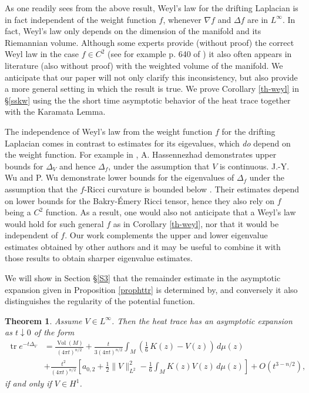 \documentclass[letterpaper,12pt]{amsart}
\newtheorem{thm}{Theorem}[section]
\newcommand{\tr}{\mathop{\mathrm{tr}}}
\newcommand{\Vol}{\operatorname{Vol}}
\begin{document}
As one readily sees from the above result, Weyl's law for the drifting Laplacian is in fact independent of the weight function $f$, whenever $\nabla f$ and $\Delta f$ are in $L^\infty$. In fact, Weyl's law only depends on the dimension of the manifold and its Riemannian volume. Although some experts provide (without proof)  the correct Weyl law  in the case $f\in C^2$ (see for example p. 640 of \cite{css}) it also often appears in literature (also without proof) with the weighted volume of the manifold. We anticipate that our paper will not only clarify this inconsistency, but also provide a more general setting in which the result is true.  We prove Corollary \ref{th-weyl} in \S \ref{sskw} using the the short time asymptotic behavior of the heat trace together with the Karamata Lemma.

The independence of Weyl's law from the weight function $f$ for the drifting Laplacian comes in contrast to estimates for its eigevalues, which {\it do } depend on the weight function.  For example in \cite{asma1}, A. Hassennezhad demonstrates upper bounds for $\Delta_V$ and hence $\Delta_f$, under the assumption that $V$ is continuous.
J.-Y. Wu and P. Wu demonstrate lower bounds for the eigenvalues of $\Delta_f$ under the assumption that the $f$-Ricci curvature is bounded below \cite{wuwu}.  Their estimates depend on lower bounds for the Bakry-\'Emery Ricci tensor, hence they also rely on $f$ being a $C^2$ function. As a result, one would also not anticipate that a Weyl's law would hold for such general $f$ as in Corollary \ref{th-weyl}, nor that it would be independent of $f$.
Our work complements the upper and lower eigenvalue estimates obtained by other authors and it may be useful to combine it with those results to obtain sharper eigenvalue estimates.




We will show in Section \S \ref{S3} that the remainder estimate in the asymptotic expansion given in Proposition \ref{prophttr} is determined by, and conversely it also distinguishes the regularity of the potential function.
\begin{thm}  \label{thm3.2} Assume $V \in L^\infty$.  Then the heat trace has an asymptotic expansion as $t \downarrow 0$ of the form
\begin{equation*}
\begin{split}
\tr e^{-t\Delta_V} & =  \frac{\Vol (M)}{(4\pi t)^{n/2}} +  \frac{t}{3(4\pi t)^{n/2}}  \int_M \left(\frac{1}{6} \, K(z)   -  V(z) \right)\, d\mu (z) \\
 &  + \frac{t^2}{(4\pi t)^{n/2}} \left[ a_{0,2}  + \frac{1}{2} \|V\|_{L^2}^2
 - \frac{1}{6}  \int_M K(z) V(z)  \,d\mu (z)    \right] + O(t^{3-n/2}),
\end{split}
\end{equation*}
if and only if $V \in H^1$.
\end{thm}
\end{document}
